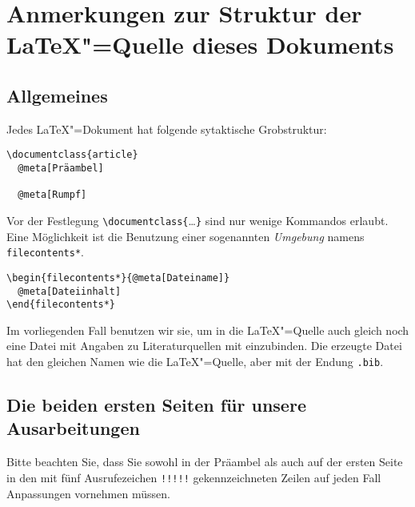 \section{Anmerkungen zur Struktur der \LaTeX"=Quelle dieses Dokuments}
\label{sec:dokument-struktur}

\subsection{Allgemeines}

Jedes \LaTeX"=Dokument hat folgende sytaktische Grobstruktur:

\begin{tcolorbox}
\begin{Verbatim}[commandchars=\@\[\]]
\documentclass{article}
  @meta[Präambel]

  @meta[Rumpf]

\end{Verbatim}
\end{tcolorbox}

Vor der Festlegung \verb|\documentclass{|\dots\verb|}| sind nur wenige
Kommandos erlaubt.
%
Eine Möglichkeit ist die Benutzung einer sogenannten \emph{Umgebung} namens
\verb|filecontents*|.

\begin{tcolorbox}
\begin{Verbatim}[commandchars=\@\[\]]
\begin{filecontents*}{@meta[Dateiname]}
  @meta[Dateiinhalt]
\end{filecontents*}
\end{Verbatim}
\end{tcolorbox}

Im vorliegenden Fall benutzen wir sie, um in die \LaTeX"=Quelle auch gleich
noch eine Datei mit Angaben zu Literaturquellen mit einzubinden.
%
Die erzeugte Datei hat den gleichen Namen wie die \LaTeX"=Quelle, aber mit der
Endung \verb|.bib|.


\subsection{Die beiden ersten Seiten für unsere Ausarbeitungen}


Bitte beachten Sie, dass Sie sowohl in der Präambel als auch auf der ersten
Seite in den mit fünf Ausrufezeichen \texttt{!!!!!} gekennzeichneten Zeilen
auf jeden Fall Anpassungen vornehmen müssen.


